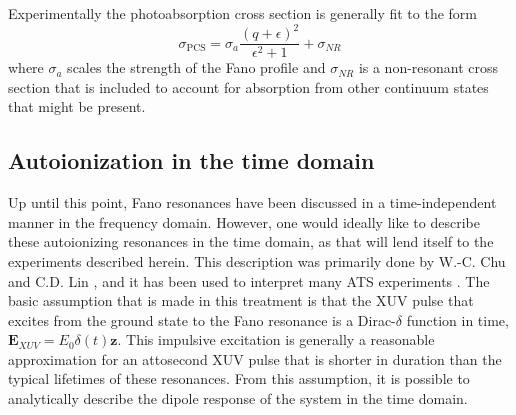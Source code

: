 Experimentally the photoabsorption cross section is generally fit to the form
\begin{equation}
\label{eqn:sigma_pcs}
	\sigma_\mathrm{PCS}=\sigma_a\frac{(q+\epsilon)^2}{\epsilon^2+1}+\sigma_{NR}
\end{equation}
where $\sigma_a$ scales the strength of the Fano profile and $\sigma_{NR}$ is  a non-resonant cross section that is included to account for absorption from  other continuum states that might be present.  



\subsection{Autoionization in the time domain}
\label{sec:time_dependent_autoionization}
%
%

Up until this point, Fano resonances have been discussed in a time-independent manner in the frequency domain.  However, one would ideally like to describe these autoionizing resonances in the time domain, as that will lend itself to the experiments described herein. This description was primarily done by W.-C. Chu and C.D. Lin \cite{chuTheoryUltrafastAutoionization2010}, and it has been used to interpret many ATS experiments  \cite{kaldunExtractingPhaseAmplitude2014,ottLorentzMeetsFano2013,ottReconstructionControlTimedependent2014, stoossRealTimeReconstructionStrongFieldDriven2018}.  The basic assumption that is made in this treatment is that the XUV pulse that excites from the ground state to the Fano resonance is a Dirac-$\delta$ function in time, $\mathbf{E}_{XUV}=E_0\delta(t)\mathbf{z}$.  This impulsive excitation is generally a reasonable  approximation for an attosecond XUV pulse that is shorter in duration than the typical lifetimes of these resonances.  From this assumption, it is possible to analytically describe the dipole response of the system in the time domain.


